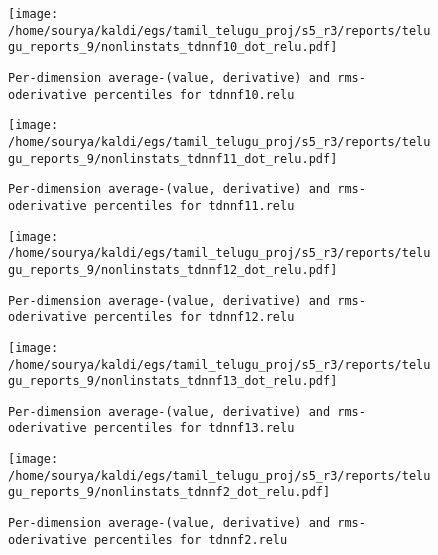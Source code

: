 \documentclass[prl,10pt,twocolumn]{revtex4}
\begin{document}
\newpage
\begin{figure}[h]
  \begin{center}
    \caption{\texttt{Per-dimension average-(value, derivative) and rms-oderivative percentiles for tdnnf10.relu}}
    \texttt{[image: /home/sourya/kaldi/egs/tamil\_telugu\_proj/s5\_r3/reports/telugu\_reports\_9/nonlinstats\_tdnnf10\_dot\_relu.pdf]}
  \end{center}
\end{figure}
\clearpage


\newpage
\begin{figure}[h]
  \begin{center}
    \caption{\texttt{Per-dimension average-(value, derivative) and rms-oderivative percentiles for tdnnf11.relu}}
    \texttt{[image: /home/sourya/kaldi/egs/tamil\_telugu\_proj/s5\_r3/reports/telugu\_reports\_9/nonlinstats\_tdnnf11\_dot\_relu.pdf]}
  \end{center}
\end{figure}
\clearpage


\newpage
\begin{figure}[h]
  \begin{center}
    \caption{\texttt{Per-dimension average-(value, derivative) and rms-oderivative percentiles for tdnnf12.relu}}
    \texttt{[image: /home/sourya/kaldi/egs/tamil\_telugu\_proj/s5\_r3/reports/telugu\_reports\_9/nonlinstats\_tdnnf12\_dot\_relu.pdf]}
  \end{center}
\end{figure}
\clearpage


\newpage
\begin{figure}[h]
  \begin{center}
    \caption{\texttt{Per-dimension average-(value, derivative) and rms-oderivative percentiles for tdnnf13.relu}}
    \texttt{[image: /home/sourya/kaldi/egs/tamil\_telugu\_proj/s5\_r3/reports/telugu\_reports\_9/nonlinstats\_tdnnf13\_dot\_relu.pdf]}
  \end{center}
\end{figure}
\clearpage


\newpage
\begin{figure}[h]
  \begin{center}
    \caption{\texttt{Per-dimension average-(value, derivative) and rms-oderivative percentiles for tdnnf2.relu}}
    \texttt{[image: /home/sourya/kaldi/egs/tamil\_telugu\_proj/s5\_r3/reports/telugu\_reports\_9/nonlinstats\_tdnnf2\_dot\_relu.pdf]}
  \end{center}
\end{figure}
\clearpage
\end{document}
